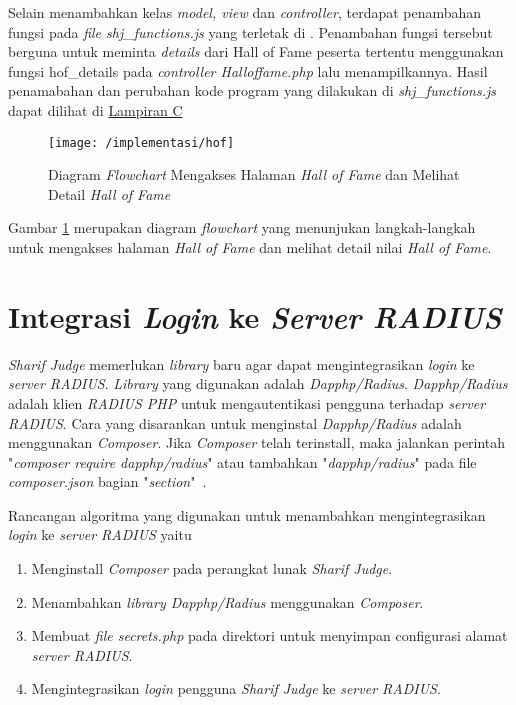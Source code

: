 Selain menambahkan kelas \textit{model, view} dan \textit{controller}, terdapat penambahan fungsi pada \textit{file shj\_functions.js} yang terletak di . Penambahan fungsi tersebut berguna untuk meminta \textit{details} dari Hall of Fame peserta tertentu menggunakan fungsi hof\_details pada \textit{controller Halloffame.php} lalu menampilkannya. Hasil penamabahan dan perubahan kode program yang dilakukan di \textit{shj\_functions.js} dapat dilihat di \hyperref[lamp:kodeprogramshjfunc]{Lampiran C}

\begin{figure}[H]
	\centering  
	\texttt{[image: /implementasi/hof]}  
	\caption[Diagram \textit{Flowchart} Mengakses Halaman \textit{Hall of Fame} dan Melihat Detail \textit{Hall of Fame}]{Diagram \textit{Flowchart} Mengakses Halaman \textit{Hall of Fame} dan Melihat Detail \textit{Hall of Fame}} 
	\label{fig:ihof} 
\end{figure}
Gambar \ref{fig:ihof} merupakan diagram \textit{flowchart} yang menunjukan langkah-langkah untuk mengakses halaman \textit{Hall of Fame} dan melihat detail nilai \textit{Hall of Fame}.

\section{Integrasi \textit{Login} ke \textit{Server RADIUS}}
\textit{Sharif Judge} memerlukan \textit{library} baru agar dapat mengintegrasikan \textit{login} ke \textit{server RADIUS}. \textit{Library} yang digunakan adalah \textit{Dapphp/Radius}. \textit{Dapphp/Radius} adalah klien \textit{RADIUS PHP} untuk mengautentikasi pengguna terhadap \textit{server RADIUS}. Cara yang disarankan untuk menginstal \textit{Dapphp/Radius} adalah menggunakan \textit{Composer}. Jika \textit{Composer} telah terinstall, maka jalankan perintah "\textit{composer require dapphp/radius}" atau tambahkan "\textit{dapphp/radius}" pada file \textit{composer.json} bagian "\textit{section}"~\cite{drew:16:radius}.

Rancangan algoritma yang digunakan untuk menambahkan mengintegrasikan \textit{login} ke \textit{server RADIUS} yaitu
\begin{enumerate}
	\item Menginstall \textit{Composer} pada perangkat lunak \textit{Sharif Judge}.
	\item Menambahkan \textit{library Dapphp/Radius} menggunakan \textit{Composer}.
	\item Membuat \textit{file secrets.php} pada direktori  untuk menyimpan configurasi alamat \textit{server RADIUS}.
	\item Mengintegrasikan \textit{login} pengguna \textit{Sharif Judge} ke \textit{server RADIUS}.
\end{enumerate}

